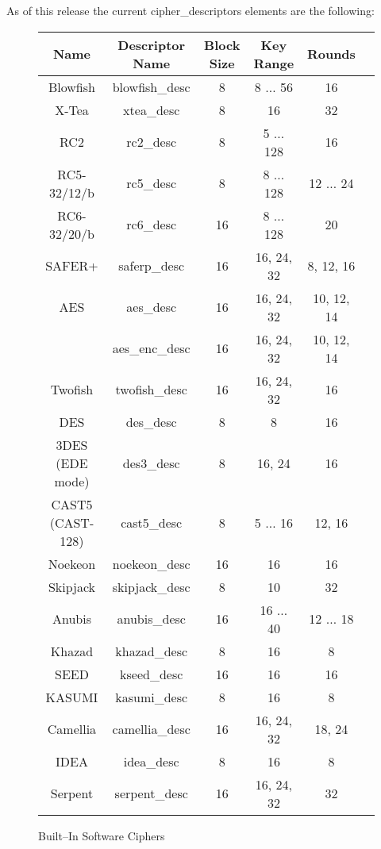 \documentclass[synpaper]{book}
\begin{document}
As of this release the current cipher\_descriptors elements are the following:
\vfil
{}
       
         
 
\begin{figure}[hpbt]
\begin{small}
\begin{center}
\begin{tabular}{|c|c|c|c|c|c|}
     \hline \textbf{Name} & \textbf{Descriptor Name} & \textbf{Block Size} & \textbf{Key Range} & \textbf{Rounds} \\
     \hline Blowfish & blowfish\_desc & 8 & 8 $\ldots$ 56 & 16 \\
     \hline X-Tea & xtea\_desc & 8 & 16 & 32 \\
     \hline RC2 & rc2\_desc & 8 & 5 $\ldots$ 128 & 16 \\
     \hline RC5-32/12/b & rc5\_desc & 8 & 8 $\ldots$ 128 & 12 $\ldots$ 24 \\
     \hline RC6-32/20/b & rc6\_desc & 16 & 8 $\ldots$ 128 & 20 \\
     \hline SAFER+ & saferp\_desc &16 & 16, 24, 32 & 8, 12, 16 \\
     \hline AES & aes\_desc & 16 & 16, 24, 32 & 10, 12, 14 \\
                & aes\_enc\_desc & 16 & 16, 24, 32 & 10, 12, 14 \\
     \hline Twofish & twofish\_desc & 16 & 16, 24, 32 & 16 \\
     \hline DES & des\_desc & 8 & 8 & 16 \\
     \hline 3DES (EDE mode) & des3\_desc & 8 & 16, 24 & 16 \\
     \hline CAST5 (CAST-128) & cast5\_desc & 8 & 5 $\ldots$ 16 & 12, 16 \\
     \hline Noekeon & noekeon\_desc & 16 & 16 & 16 \\
     \hline Skipjack & skipjack\_desc & 8 & 10 & 32 \\
     \hline Anubis & anubis\_desc & 16 & 16 $\ldots$ 40 & 12 $\ldots$ 18 \\
     \hline Khazad & khazad\_desc & 8 & 16 & 8 \\
     \hline SEED   & kseed\_desc & 16 & 16 & 16 \\
     \hline KASUMI & kasumi\_desc & 8 & 16 & 8 \\
     \hline Camellia & camellia\_desc & 16 & 16, 24, 32 & 18, 24 \\
     \hline IDEA & idea\_desc & 8 & 16 & 8 \\
     \hline Serpent & serpent\_desc & 16 & 16, 24, 32 & 32 \\
     \hline
\end{tabular}
\end{center}
\end{small}
\caption{Built--In Software Ciphers}
\end{figure}
\end{document}
